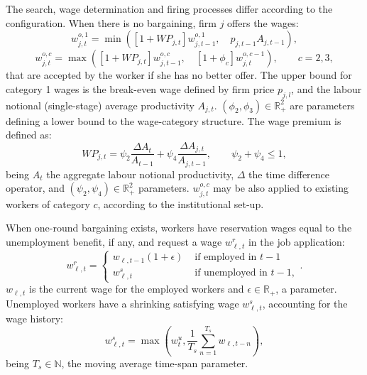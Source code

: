 \documentclass[a4paper,11pt]{article}
\begin{document}
\begin{appendices}
The search, wage determination and firing processes differ according to the configuration. When there is no bargaining, firm $j$ offers the wages:
\begin{equation}
	w_{j,t}^{o,1} = \min \left( \left[ 1 + {WP}_{j,t} \right] w_{j,t-1}^{o,1}, \quad p_{j,t-1} A_{j,t-1} \right),
\end{equation}
\begin{equation}
	w_{j,t}^{o,c} = \max \left( \left[ 1 + {WP}_{j,t} \right] w_{j,t-1}^{o,c}, \quad \left[ 1 + \phi_c \right] w_{j,t}^{o,c-1} \right), \qquad c = 2, 3,
\end{equation}
that are accepted by the worker if she has no better offer. The upper bound for category 1 wages is the break-even wage defined by firm price $p_{j,l}$, and the labour notional (single-stage) average productivity $A_{j,t}$. $(\phi_2, \phi_3) \in \mathbb{R}_+^2$ are parameters defining a lower bound to the wage-category structure. The wage premium is defined as:
\begin{equation}
	{WP}_{j,t} = \psi_2 \frac{ \Delta A_{t} }{ A_{t-1} } + \psi_4 \frac{ \Delta A_{j,t} }{ A_{j,t-1} }, \qquad \psi_2 + \psi_4 \leq 1,
\end{equation}
being $A_{t}$ the aggregate labour notional productivity, $\Delta$ the time difference operator, and $(\psi_2, \psi_4) \in \mathbb{R}^2_+$ parameters. $w_{j,t}^{o,c}$ may be also applied to existing workers of category $c$, according to the institutional set-up.

When one-round bargaining exists, workers have reservation wages equal to the unemployment benefit, if any, and request a wage $w_{\ell,t}^r$ in the job application:
\begin{equation}
	\label{worker}
	w_{\ell,t}^r =
	\begin{cases}
		w_{\ell,t-1} ( 1 + \epsilon ) & \mbox{ if employed in } t - 1 \\
		w_{\ell,{t}}^s & \mbox{ if unemployed in } t - 1,
	\end{cases}.
\end{equation}
$w_{\ell,t}$ is the current wage for the employed workers and $\epsilon \in \mathbb{R}_+$, a parameter. Unemployed workers have a shrinking satisfying wage $w_{\ell,{t}}^s$, accounting for the wage history:
\begin{equation}
	w_{\ell,t}^s = \max \left( w_{t}^u, \frac{ 1 }{ T_s } {\sum_{n=1}^{T_s}} w_{\ell,t-n} \right),
\end{equation}
being $T_s \in \mathbb{N}$, the moving average time-span parameter.


\end{appendices}
\end{document}

